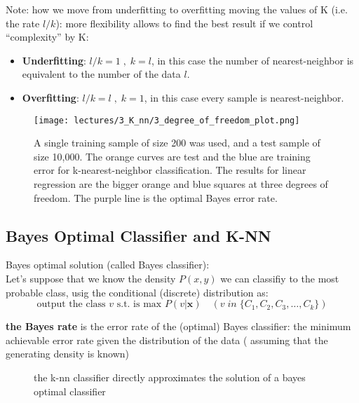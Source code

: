 \documentclass[../main.tex]{subfiles}
\begin{document}
Note: how we move from underfitting to overfitting moving the values of K (i.e. the rate $l/k$): more flexibility allows to find the best result if we control “complexity” by K:
\begin{itemize}
    \item \textbf{Underfitting}: $l/k = 1 \;,\; k=l $, in this case the number of nearest-neighbor is equivalent to the number of the data $l$.
    \item \textbf{Overfitting}: $l/k = l \;,\; k=1 $, in this case every sample is nearest-neighbor.
\end{itemize}

\begin{figure}
    \centering
    \texttt{[image: lectures/3\_K\_nn/3\_degree\_of\_freedom\_plot.png]}
    \caption{A single training sample of size 200 was used, and a test sample of size 10,000. The orange curves are test and the blue are training error for k-nearest-neighbor classification. The results for linear regression are the bigger orange and blue squares at three degrees of freedom. The purple line is the optimal Bayes error rate.}
    \label{fig:3_degree_of_freedom_plot}
\end{figure}
\subsection{Bayes Optimal Classifier and K-NN}
Bayes optimal solution (called Bayes classifier):\\

Let's suppose that we know the density $P(x,y)$ we can classifiy to the most probable class, usig the conditional (discrete) distribution as:
\[
    \text{output the class } v \text{ s.t. is max } P(v|\mathbf{x}) \quad (v \; in \; \{C_1, C_2, C_3, \dots, C_k\})
\]

\textbf{ the Bayes rate} is the error rate of the (optimal) Bayes classifier: the minimum achievable error rate given the distribution of the data ( assuming that the generating density is known)

\begin{figure}[H]
  \centering
  \hfill
  \caption{the k-nn classifier directly approximates the solution of a bayes optimal classifier}
\end{figure}
\end{document}
